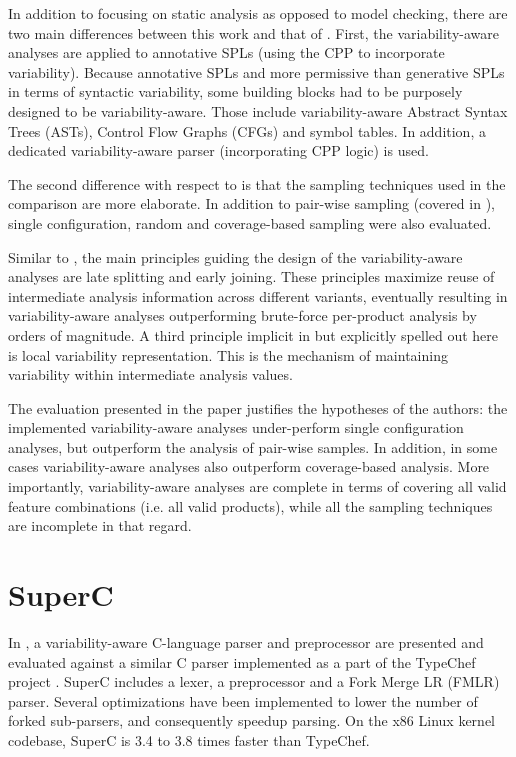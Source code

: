 \documentclass[11pt]{article}
\begin{document}
In addition to focusing on static analysis as opposed to model checking, there are two main differences between this work and that of \cite{Apel:2013}. First, the variability-aware analyses are applied to annotative SPLs (using the CPP to incorporate variability). Because annotative SPLs and more permissive than generative SPLs in terms of syntactic variability, some building blocks had to be purposely designed to be variability-aware. Those include variability-aware Abstract Syntax Trees (ASTs), Control Flow Graphs (CFGs) and symbol tables. In addition, a dedicated variability-aware parser (incorporating CPP logic) is used.

The second difference with respect to \cite{Apel:2013} is that the sampling techniques used in the comparison are more elaborate. In addition to pair-wise sampling (covered in \cite{Apel:2013}), single configuration, random and coverage-based sampling were also evaluated.

Similar to \cite{Apel:2013}, the main principles guiding the design of the variability-aware analyses are late splitting and early joining. These principles maximize reuse of intermediate analysis information across different variants, eventually resulting in variability-aware analyses outperforming brute-force per-product analysis by orders of magnitude. A third principle implicit in \cite{Apel:2013} but explicitly spelled out here is local variability representation. This is the mechanism of maintaining variability within intermediate analysis values.

The evaluation presented in the paper justifies the hypotheses of the authors: the implemented variability-aware analyses under-perform single configuration analyses, but outperform the analysis of pair-wise samples. In addition, in some cases variability-aware analyses also outperform coverage-based analysis. More importantly, variability-aware analyses are complete in terms of covering all valid feature combinations (i.e. all valid products), while all the sampling techniques are incomplete in that regard.

\section{SuperC}
In \cite{Gazzillo:2012}, a variability-aware C-language parser and preprocessor are presented and evaluated against a similar C parser implemented as a part of the TypeChef project \cite{Kastner:2011}. SuperC includes a lexer, a preprocessor and a Fork Merge LR (FMLR) parser. Several optimizations have been implemented to lower the number of forked sub-parsers, and consequently speedup parsing. On the x86 Linux kernel codebase, SuperC is 3.4 to 3.8 times faster than TypeChef.
\end{document}
